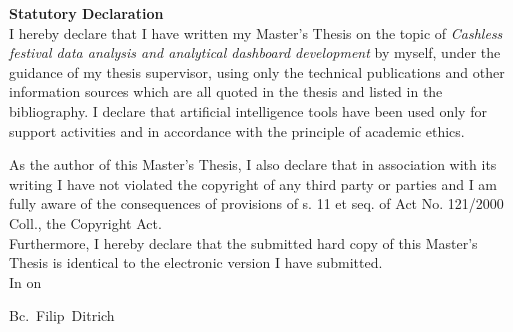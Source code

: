 \newpage
\pagestyle{empty}

\noindent
{\large\bfseries Statutory Declaration}\\

\noindent
I hereby declare that I have written my Master's Thesis on the topic of \textit{Cashless festival data analysis and analytical dashboard development} by myself, under the guidance of my thesis supervisor, using only the technical publications and other information sources which are all quoted in the thesis and listed in the bibliography.
I declare that artificial intelligence tools have been used only for support activities and in accordance with the principle of academic ethics.

As the author of this Master's Thesis, I also declare that in association with its writing I have not violated the copyright of any third party or parties and I am fully aware of the consequences of provisions of s. 11 et seq. of Act No. 121/2000 Coll., the Copyright Act.\\

Furthermore, I hereby declare that the submitted hard copy of this Master's Thesis is identical to the electronic version I have submitted.\\

\vspace{18mm}
\noindent
In \makebox[4cm]{\dotfill} on \makebox[2.5cm]{\dotfill}
\hspace*{\fill}
\makebox[4cm]{\dotfill}

\begin{flushright}
	\noindent
	Bc.~Filip~Ditrich
\end{flushright}
